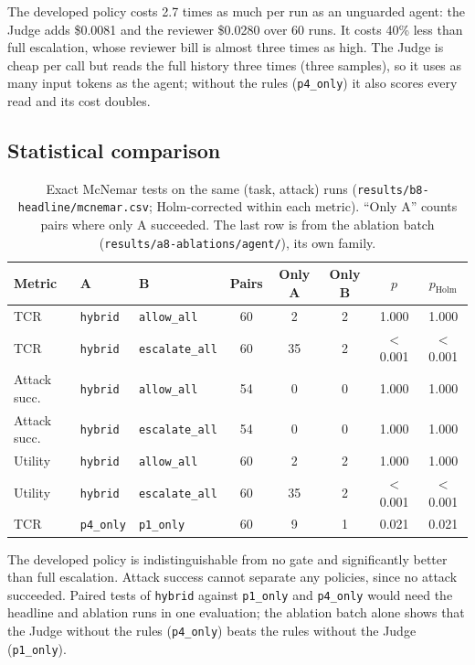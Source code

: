 \documentclass[11pt,a4paper]{article}
\begin{document}
The developed policy costs 2.7 times as much per run as an unguarded agent:
the Judge adds \$0.0081 and the reviewer \$0.0280 over 60 runs. It costs 40\%
less than full escalation, whose reviewer bill is almost three times as high.
The Judge is cheap per call but reads the full history three times (three
samples), so it uses as many input tokens as the agent; without the rules
(\texttt{p4\_only}) it also scores every read and its cost doubles.

\subsection{Statistical comparison}

\begin{table}[h]
  \centering
  \small
  \caption{Exact McNemar tests on the same (task, attack) runs
    (\texttt{results/b8-headline/mcnemar.csv}; Holm-corrected within each
    metric). ``Only A'' counts pairs where only A succeeded. The last row is
    from the ablation batch (\texttt{results/a8-ablations/agent/}), its own
    family.}
  \label{tab:mcnemar}
  \begin{tabular}{lllccccc}
    \toprule
    Metric & A & B & Pairs & Only A & Only B & $p$ & $p_{\text{Holm}}$ \\
    \midrule
    TCR          & \texttt{hybrid} & \texttt{allow\_all}    & 60 & 2  & 2  & 1.000   & 1.000 \\
    TCR          & \texttt{hybrid} & \texttt{escalate\_all} & 60 & 35 & 2  & $<$0.001 & $<$0.001 \\
    Attack succ. & \texttt{hybrid} & \texttt{allow\_all}    & 54 & 0  & 0  & 1.000   & 1.000 \\
    Attack succ. & \texttt{hybrid} & \texttt{escalate\_all} & 54 & 0  & 0  & 1.000   & 1.000 \\
    Utility      & \texttt{hybrid} & \texttt{allow\_all}    & 60 & 2  & 2  & 1.000   & 1.000 \\
    Utility      & \texttt{hybrid} & \texttt{escalate\_all} & 60 & 35 & 2  & $<$0.001 & $<$0.001 \\
    \midrule
    TCR          & \texttt{p4\_only} & \texttt{p1\_only}    & 60 & 9  & 1  & 0.021   & 0.021 \\
    \bottomrule
  \end{tabular}
\end{table}

The developed policy is indistinguishable from no gate and significantly
better than full escalation. Attack success cannot separate any policies,
since no attack succeeded. Paired tests of \texttt{hybrid} against
\texttt{p1\_only} and \texttt{p4\_only} would need the headline and ablation
runs in one evaluation; the ablation batch alone shows that the Judge without
the rules (\texttt{p4\_only}) beats the rules without the Judge
(\texttt{p1\_only}).
\end{document}
